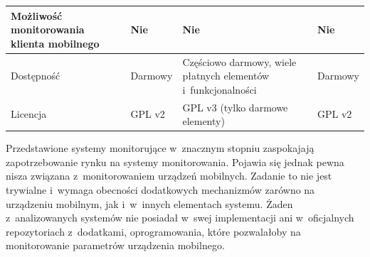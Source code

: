 \begin{longtable}[c]{|p{4.5cm}||p{3cm}|p{3cm}|p{3cm}|}
  \raggedright{Możliwość monitorowania klienta mobilnego} & \raggedright{Nie} &
  \raggedright{Nie} & \raggedright{Nie}
  \tabularnewline
  \hline

  \raggedright{Dostępność} & \raggedright{Darmowy} &
  \raggedright{Częściowo darmowy, wiele płatnych elementów i~funkcjonalności} & \raggedright{Darmowy}
  \tabularnewline
  \hline

  \raggedright{Licencja} & \raggedright{GPL v2} &
  \raggedright{GPL v3 (tylko darmowe elementy)} & \raggedright{GPL v2}
  \tabularnewline
  \hline

\end{longtable}

Przedstawione systemy monitorujące w~znacznym stopniu zaspokajają
zapotrzebowanie rynku na systemy monitorowania. Pojawia się jednak
pewna nisza związana z~monitorowaniem urządzeń mobilnych. Zadanie to
nie jest trywialne i~wymaga obecności dodatkowych mechanizmów zarówno
na urządzeniu mobilnym, jak i~w~innych elementach systemu. Żaden
z~analizowanych systemów nie posiadał w~swej implementacji ani
w~oficjalnych repozytoriach z~dodatkami, oprogramowania, które
pozwalałoby na monitorowanie parametrów urządzenia mobilnego.

